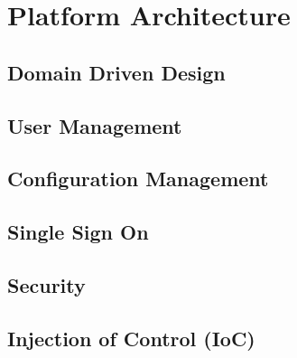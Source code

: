 \chapter{Platform Architecture}\label{ch01:01}

\section{Domain Driven Design}

\section{User Management}

\section{Configuration Management}

\section{Single Sign On}

\section{Security}

\section{Injection of Control (IoC)}  